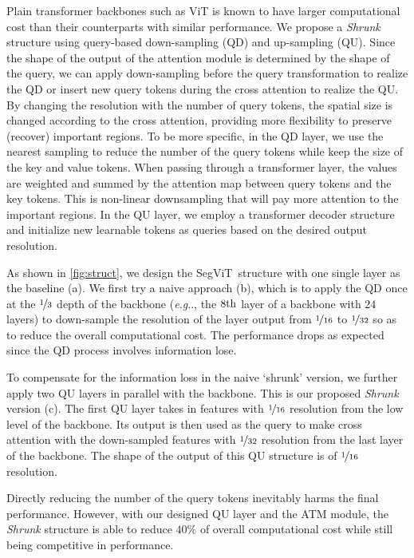 \documentclass{article}
\makeatletter
\renewcommand{\paragraph}{\@startsection{paragraph}{4}{\z@}{.5ex \@plus 1ex \@minus .2ex}{-1em}{\normalfont\normalsize\bfseries}}
\DeclareRobustCommand\onedot{\futurelet\@let@token\@onedot}
\def\@onedot{\ifx\@let@token.\else.\null\fi\xspace}
\def\eg{\emph{e.g}\onedot}
\def\seg{SegViT}
\makeatother
\begin{document}
\paragraph{The \emph{Shrunk} structure.}
Plain transformer backbones such as ViT is known to have larger computational cost than their counterparts with similar performance. 
We propose a \emph{Shrunk} structure using query-based down-sampling (QD) and up-sampling (QU). 
Since the shape of the output of the attention module is determined by the shape of the query, 
we can apply down-sampling before the query transformation to realize the QD or insert new query tokens during the cross attention to realize the QU. By changing the resolution with the number of query tokens, the spatial size is changed according to the cross attention, providing more flexibility to preserve (recover) important regions.
To be more specific, 
in the QD layer, we use the nearest sampling to reduce the number of the query tokens while keep the size of the key and value tokens. When passing through a transformer layer, the values are weighted and summed by the attention map between query tokens and the key tokens. This is non-linear downsampling that will pay more attention to the important regions.  In the QU layer, we employ a transformer decoder structure~\cite{2017attention} and initialize new learnable tokens as queries based on the desired output resolution.  

As shown 
in \cref{fig:struct}, we design the 
\seg\ structure with one single layer as the baseline (a).  
We first try 
a naive approach (b), which is to apply the QD once at the $\nicefrac{1}{3}$ depth of the backbone (\eg, the $8\rm th$ layer of a backbone with $24$ layers) to down-sample 
the resolution of the layer output from $\nicefrac{1}{16}$ to $\nicefrac{1}{32}$
so as 
to reduce the overall computational cost.
The performance drops as expected since the QD process involves information lose.

To compensate for the information loss in the naive `shrunk' version, we further apply 
 two QU layers in parallel with the backbone.
 This is our proposed \emph{Shrunk} version (c).
 The first QU layer takes in features with $\nicefrac{1}{16}$ resolution from the low level of the backbone. Its output is then used as the query to make cross attention with the down-sampled features  with $\nicefrac{1}{32}$ resolution from the last layer of the backbone.
The shape of the output of this QU structure is of $\nicefrac{1}{16}$ resolution.

Directly reducing the number of the query tokens inevitably 
harms  the final performance.
However, with our designed QU layer and the ATM module, the \emph{Shrunk} structure is able to reduce $40\%$ of overall computational cost while still being competitive in performance.
\end{document}
